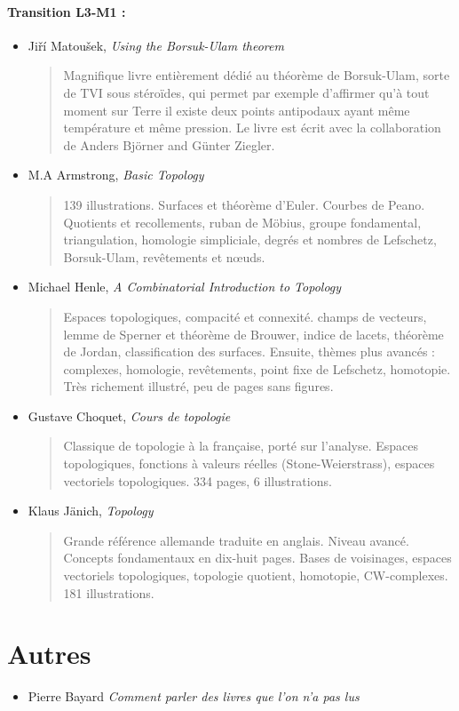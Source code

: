\documentclass{article}
\begin{document}
\paragraph{Transition L3-M1 :}
\begin{itemize}
\item Jiří Matoušek, \emph{Using the Borsuk-Ulam theorem}
\begin{quote}
Magnifique livre entièrement dédié au théorème de Borsuk-Ulam, sorte de TVI sous stéroïdes, qui permet par exemple d'affirmer qu'à tout moment sur Terre il existe deux points antipodaux ayant même température et même pression. Le livre est écrit avec la collaboration de Anders Björner and Günter Ziegler.
\end{quote}
\item M.A Armstrong, \emph{Basic Topology}
\begin{quote}
139 illustrations. Surfaces et théorème d'Euler. Courbes de Peano. Quotients et recollements, ruban de Möbius, groupe fondamental, triangulation, homologie simpliciale, degrés et nombres de Lefschetz, Borsuk-Ulam, revêtements et n\oe uds.
\end{quote}
\item Michael Henle, \emph{A Combinatorial Introduction to Topology}
\begin{quote}
Espaces topologiques, compacité et connexité. champs de vecteurs, lemme de Sperner et théorème de Brouwer, indice de lacets, théorème de Jordan, classification des surfaces. Ensuite, thèmes plus avancés : complexes, homologie, revêtements, point fixe de Lefschetz, homotopie. Très richement illustré, peu de pages sans figures.
\end{quote}
\item Gustave Choquet, \emph{Cours de topologie}
\begin{quote}
Classique de topologie à la française, porté sur l'analyse. Espaces topologiques, fonctions à valeurs réelles (Stone-Weierstrass), espaces vectoriels topologiques. 334 pages, 6 illustrations.
\end{quote}
\item Klaus Jänich, \emph{Topology}
\begin{quote}
Grande référence allemande traduite en anglais.  Niveau avancé. \og Concepts fondamentaux\fg{} en dix-huit pages. Bases de voisinages, espaces vectoriels topologiques, topologie quotient, homotopie, CW-complexes. 181 illustrations.
\end{quote}

\end{itemize}






\section{Autres}


\begin{itemize}
\item Pierre Bayard \emph{Comment parler des livres que l'on n'a pas lus}
\end{itemize}
\end{document}

